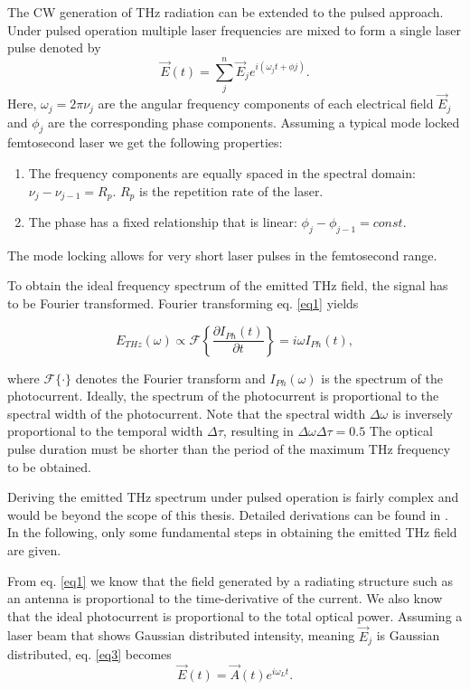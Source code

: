 The CW generation of THz radiation can be extended to the pulsed approach. Under pulsed operation multiple laser frequencies are mixed to form a single laser pulse denoted by 
\begin{equation}
	\vec{E}(t) = \sum_j^n \vec{E}_je^{i(\omega_j t + \phi j)}.
\label{eq3}
\end{equation}
Here, $\omega_j = 2 \pi \nu_j$ are the angular frequency components of each electrical field $\vec{E}_j$ and $\phi_j$ are the corresponding phase components. Assuming a typical mode locked femtosecond laser we get the following properties: 
\renewcommand{\labelenumi}{\alph{enumi})}
\begin{enumerate}
	\item The frequency components are equally spaced in the spectral domain: $\nu_j - \nu_{j-1} = R_p$. $R_p$ is the repetition rate of the laser.
	\item The phase has a fixed relationship that is linear: $\phi_j - \phi_{j-1} = const.$
\end{enumerate}

The mode locking allows for very short laser pulses in the femtosecond range.

To obtain the ideal frequency spectrum of the emitted THz field, the signal has to be Fourier transformed. Fourier transforming eq. \eqref{eq1} yields

\begin{equation}
	E_{THz}(\omega) \propto \mathcal{F}\left\{ \frac{\partial I_{Ph}(t)}{\partial t} \right\} = i\omega I_{Ph}(t), 
\end{equation}

where $\mathcal{F}\{\cdot \}$ denotes the Fourier transform and $I_{Ph}(\omega)$ is the spectrum of the photocurrent. Ideally, the spectrum of the photocurrent is proportional to the spectral width of the photocurrent. Note that the spectral width $\Delta \omega$ is inversely proportional to the temporal width $\Delta \tau$, resulting in $\Delta \omega \Delta \tau = 0.5$ The optical pulse duration must be shorter than the period of the maximum THz frequency to be obtained. 

Deriving the emitted THz spectrum under pulsed operation is fairly complex and would be beyond the scope of this thesis. Detailed derivations can be found in \cite{preuPrinciplesTHzGeneration2015}. In the following, only some fundamental steps in obtaining the emitted THz field are given.

From eq. \eqref{eq1} we know that the field generated by a radiating structure such as an antenna is proportional to the time-derivative of the current. We also know that the ideal photocurrent is proportional to the total optical power. Assuming a laser beam that shows Gaussian distributed intensity, meaning $\vec{E}_j$ is Gaussian distributed, eq. \eqref{eq3} becomes
\begin{equation}
	\vec{E}(t) = \vec{A}(t)e^{i\omega_Lt}.
\label{eq4} 
\end{equation}

